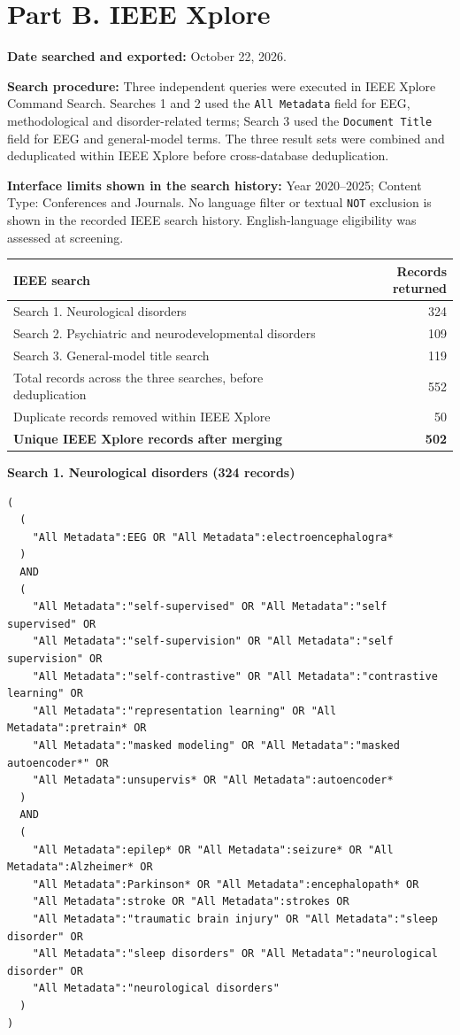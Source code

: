 \documentclass[11pt,letterpaper]{article}
\begin{document}
\clearpage
\section*{Part B. IEEE Xplore}
\textbf{Date searched and exported:} October 22, 2026.

\textbf{Search procedure:} Three independent queries were executed in IEEE Xplore Command Search. Searches 1 and 2 used the \texttt{All Metadata} field for EEG, methodological and disorder-related terms; Search 3 used the \texttt{Document Title} field for EEG and general-model terms. The three result sets were combined and deduplicated within IEEE Xplore before cross-database deduplication.

\textbf{Interface limits shown in the search history:} Year 2020--2025; Content Type: Conferences and Journals. No language filter or textual \texttt{NOT} exclusion is shown in the recorded IEEE search history. English-language eligibility was assessed at screening.

\begin{tabularx}{\textwidth}{@{}Xr@{}}
\toprule
\textbf{IEEE search} & \textbf{Records returned}\\
\midrule
Search 1. Neurological disorders & 324\\
Search 2. Psychiatric and neurodevelopmental disorders & 109\\
Search 3. General-model title search & 119\\
\midrule
Total records across the three searches, before deduplication & 552\\
Duplicate records removed within IEEE Xplore & 50\\
\textbf{Unique IEEE Xplore records after merging} & \textbf{502}\\
\bottomrule
\end{tabularx}

\textbf{Search 1. Neurological disorders (324 records)}
\begin{Verbatim}[fontsize=\fontsize{8.5}{10}\selectfont,breaklines=true,breakanywhere=false,breaksymbolleft={},breaksymbolright={},frame=single,framesep=6pt]
(
  (
    "All Metadata":EEG OR "All Metadata":electroencephalogra*
  )
  AND
  (
    "All Metadata":"self-supervised" OR "All Metadata":"self supervised" OR
    "All Metadata":"self-supervision" OR "All Metadata":"self supervision" OR
    "All Metadata":"self-contrastive" OR "All Metadata":"contrastive learning" OR
    "All Metadata":"representation learning" OR "All Metadata":pretrain* OR
    "All Metadata":"masked modeling" OR "All Metadata":"masked autoencoder*" OR
    "All Metadata":unsupervis* OR "All Metadata":autoencoder*
  )
  AND
  (
    "All Metadata":epilep* OR "All Metadata":seizure* OR "All Metadata":Alzheimer* OR
    "All Metadata":Parkinson* OR "All Metadata":encephalopath* OR
    "All Metadata":stroke OR "All Metadata":strokes OR
    "All Metadata":"traumatic brain injury" OR "All Metadata":"sleep disorder" OR
    "All Metadata":"sleep disorders" OR "All Metadata":"neurological disorder" OR
    "All Metadata":"neurological disorders"
  )
)
\end{Verbatim}
\end{document}
